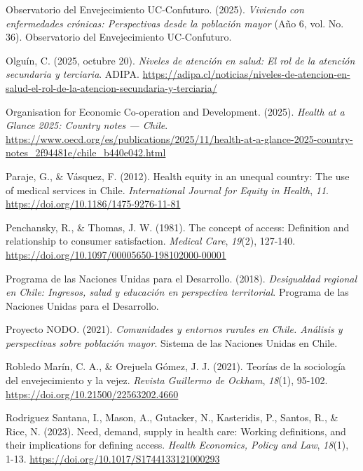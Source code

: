 \documentclass[
  spanish,
  a4paper,
  oneside]{scrbook}
\newlength{\cslhangindent}
\newenvironment{CSLReferences}[2] %
 {\begin{list}{}{%
  \setlength{\itemindent}{0pt}
  \setlength{\leftmargin}{0pt}
  \setlength{\parsep}{0pt}
  \ifodd #1
   \setlength{\leftmargin}{\cslhangindent}
   \setlength{\itemindent}{-1\cslhangindent}
  \fi
  \setlength{\itemsep}{#2\baselineskip}}}
 {\end{list}}
\begin{document}
\begin{CSLReferences}{1}{0}
Observatorio del Envejecimiento UC-Confuturo. (2025). \emph{Viviendo con
enfermedades crónicas: Perspectivas desde la población mayor} (Año 6,
vol. No. 36). Observatorio del Envejecimiento UC-Confuturo.

Olguín, C. (2025, octubre 20). \emph{Niveles de atención en salud: El
rol de la atención secundaria y terciaria}. ADIPA.
\url{https://adipa.cl/noticias/niveles-de-atencion-en-salud-el-rol-de-la-atencion-secundaria-y-terciaria/}

Organisation for Economic Co-operation and Development. (2025).
\emph{Health at a Glance 2025: {Country} notes --- {Chile}}.
\url{https://www.oecd.org/es/publications/2025/11/health-at-a-glance-2025-country-notes_2f94481e/chile_b440e042.html}

Paraje, G., \& Vásquez, F. (2012). Health equity in an unequal country:
{The} use of medical services in {Chile}. \emph{International Journal
for Equity in Health}, \emph{11}.
\url{https://doi.org/10.1186/1475-9276-11-81}

Penchansky, R., \& Thomas, J. W. (1981). The concept of access:
{Definition} and relationship to consumer satisfaction. \emph{Medical
Care}, \emph{19}(2), 127-140.
\url{https://doi.org/10.1097/00005650-198102000-00001}

Programa de las Naciones Unidas para el Desarrollo. (2018).
\emph{Desigualdad regional en Chile: Ingresos, salud y educación en
perspectiva territorial}. Programa de las Naciones Unidas para el
Desarrollo.

Proyecto NODO. (2021). \emph{Comunidades y entornos rurales en Chile.
Análisis y perspectivas sobre población mayor}. Sistema de las Naciones
Unidas en Chile.

Robledo Marín, C. A., \& Orejuela Gómez, J. J. (2021). Teorías de la
sociología del envejecimiento y la vejez. \emph{Revista Guillermo de
Ockham}, \emph{18}(1), 95-102.
\url{https://doi.org/10.21500/22563202.4660}

Rodriguez Santana, I., Mason, A., Gutacker, N., Kasteridis, P., Santos,
R., \& Rice, N. (2023). Need, demand, supply in health care: {Working}
definitions, and their implications for defining access. \emph{Health
Economics, Policy and Law}, \emph{18}(1), 1-13.
\url{https://doi.org/10.1017/S1744133121000293}


\end{CSLReferences}
\end{document}
